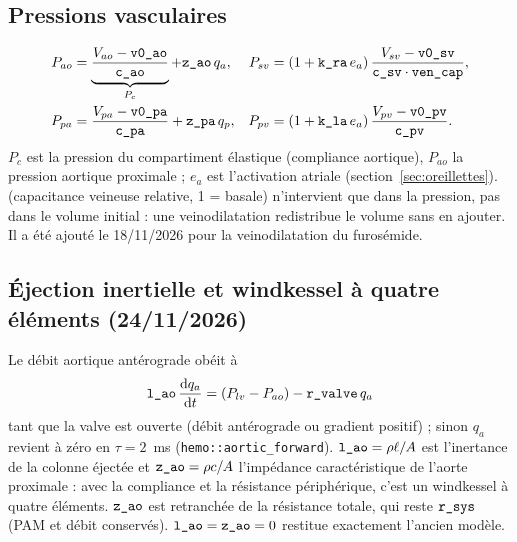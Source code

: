\documentclass[10pt,a4paper]{article}
\newcommand{\cmd}[1]{\texttt{#1}}
\newcommand{\vp}[1]{\text{\texttt{\detokenize{#1}}}}
\newcommand{\dd}{\mathrm{d}}
\begin{document}
\subsection{Pressions vasculaires}
\begin{align}
P_{ao} &= \underbrace{\frac{V_{ao} - \vp{v0_ao}}{\vp{c_ao}}}_{P_c} + \vp{z_ao}\,q_a, &
P_{sv} &= (1 + \vp{k_ra}\,e_a)\,\frac{V_{sv} - \vp{v0_sv}}{\vp{c_sv}\cdot\vp{ven_cap}},\\
P_{pa} &= \frac{V_{pa} - \vp{v0_pa}}{\vp{c_pa}} + \vp{z_pa}\,q_p, &
P_{pv} &= (1 + \vp{k_la}\,e_a)\,\frac{V_{pv} - \vp{v0_pv}}{\vp{c_pv}}.
\end{align}
$P_c$ est la pression du compartiment élastique (compliance aortique), $P_{ao}$ la pression aortique proximale ; $e_a$ est l'activation atriale (section~\ref{sec:oreillettes}). \vp{ven_cap} (capacitance veineuse relative, 1 = basale) n'intervient que dans la pression, pas dans le volume initial : une veinodilatation redistribue le volume sans en ajouter. Il a été ajouté le 18/11/2026 pour la veinodilatation du furosémide.

\subsection{Éjection inertielle et windkessel à quatre éléments (24/11/2026)}
Le débit aortique antérograde obéit à
\begin{equation}
\vp{l_ao}\,\frac{\dd q_a}{\dd t} = (P_{lv} - P_{ao}) - \vp{r_valve}\,q_a
\end{equation}
tant que la valve est ouverte (débit antérograde ou gradient positif) ; sinon $q_a$ revient à zéro en $\tau = 2$~ms (\cmd{hemo::aortic\_forward}). $\vp{l_ao} = \rho\ell/A$ est l'inertance de la colonne éjectée et $\vp{z_ao} = \rho c/A$ l'impédance caractéristique de l'aorte proximale : avec la compliance \vp{c_ao} et la résistance périphérique, c'est un windkessel à quatre éléments. $\vp{z_ao}$ est retranchée de la résistance totale, qui reste $\vp{r_sys}$ (PAM et débit conservés). $\vp{l_ao} = \vp{z_ao} = 0$ restitue exactement l'ancien modèle.
\end{document}
